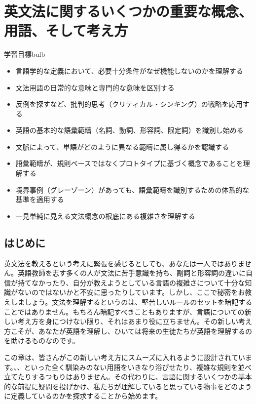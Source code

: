 \chapter{英文法に関するいくつかの重要な概念、用語、そして考え方}\label{ch:1}

\begin{tblsframedsymbol}{学習目標}{bulb}
  \begin{itemize}[noitemsep, leftmargin=*]
      \item 言語学的な定義において、必要十分条件がなぜ機能しないのかを理解する
      \item 文法用語の日常的な意味と専門的な意味を区別する
      \item 反例を探すなど、批判的思考（クリティカル・シンキング）の戦略を応用する
      \item 英語の基本的な語彙範疇（名詞、動詞、形容詞、限定詞）を識別し始める
      \item 文脈によって、単語がどのように異なる範疇に属し得るかを認識する
      \item 語彙範疇が、規則ベースではなくプロトタイプに基づく概念であることを理解する
      \item 境界事例（グレーゾーン）があっても、語彙範疇を識別するための体系的な基準を適用する
      \item 一見単純に見える文法概念の根底にある複雑さを理解する
  \end{itemize}
  \end{tblsframedsymbol}

\section{はじめに}\label{sec:intro1}

英文法を教えるという考えに緊張を感じるとしても、あなたは一人ではありません。英語教師を志す多くの人が文法に苦手意識を持ち、副詞と形容詞の違いに自信が持てなかったり、自分が教えようとしている言語の複雑さについて十分な知識がないのではないかと不安に思ったりしています。しかし、ここで秘密をお教えしましょう。文法を理解するというのは、堅苦しいルールのセットを暗記することではありません。もちろん暗記すべきこともありますが、言語についての新しい考え方を身につけない限り、それはあまり役に立ちません。その新しい考え方こそが、あなたが英語を理解し、ひいては将来の生徒たちが英語を理解するのを助けるものなのです。

この章は、皆さんがこの新しい考え方にスムーズに入れるように設計されています。、、といった全く馴染みのない用語をいきなり浴びせたり、複雑な規則を並べ立てたりするつもりはありません。その代わりに、言語に関するいくつかの基本的な前提に疑問を投げかけ、私たちが理解していると思っている物事をどのように定義しているのかを探求することから始めます。

